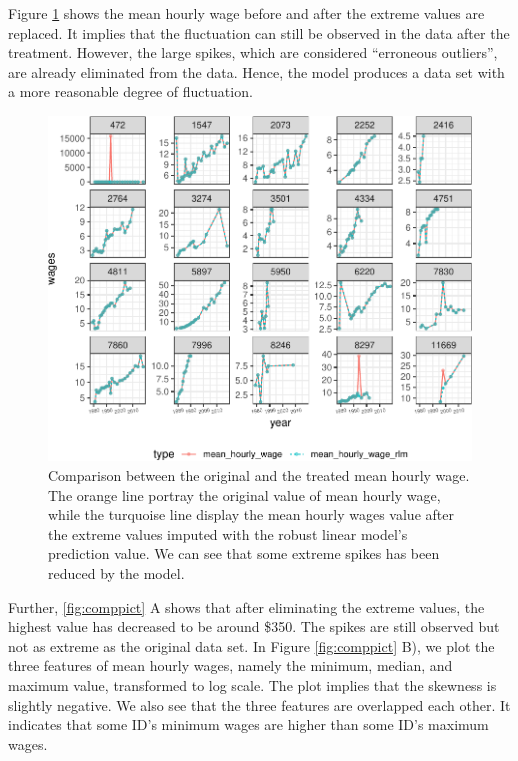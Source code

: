 \documentclass{article}
\begin{document}
Figure \ref{fig:compare-plot} shows the mean hourly wage before and after the extreme values are replaced. It implies that the fluctuation can still be observed in the data after the treatment. However, the large spikes, which are considered ``erroneous outliers'', are already eliminated from the data. Hence, the model produces a data set with a more reasonable degree of fluctuation.

\begin{figure}

{\centering \includegraphics[width=0.7\linewidth]{figures/compare-plot-1} 

}

\caption{Comparison between the original and the treated mean hourly wage. The orange line portray the original value of mean hourly wage, while the turquoise line display the mean hourly wages value after the extreme values imputed with the robust linear model's prediction value. We can see that some extreme spikes has been reduced by the model.}\label{fig:compare-plot}
\end{figure}

Further, \ref{fig:comppict} A shows that after eliminating the extreme values, the highest value has decreased to be around \$350. The spikes are still observed but not as extreme as the original data set. In Figure \ref{fig:comppict} B), we plot the three features of mean hourly wages, namely the minimum, median, and maximum value, transformed to log scale. The plot implies that the skewness is slightly negative. We also see that the three features are overlapped each other. It indicates that some ID's minimum wages are higher than some ID's maximum wages.
\end{document}
